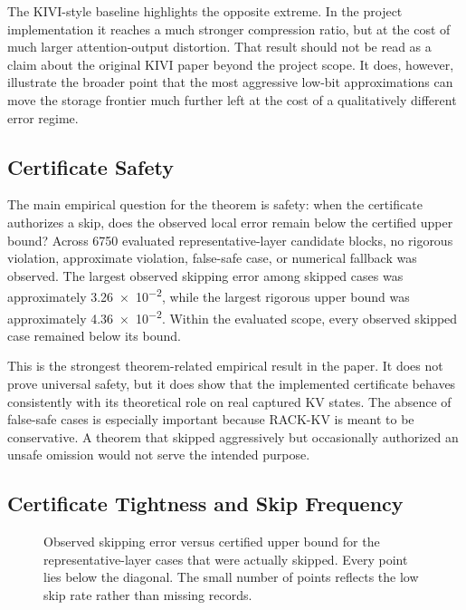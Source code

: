 The KIVI-style baseline highlights the opposite extreme. In the project implementation it reaches a much stronger compression ratio, but at the cost of much larger attention-output distortion. That result should not be read as a claim about the original KIVI paper beyond the project scope. It does, however, illustrate the broader point that the most aggressive low-bit approximations can move the storage frontier much further left at the cost of a qualitatively different error regime.

\subsection{Certificate Safety}

The main empirical question for the theorem is safety: when the certificate authorizes a skip, does the observed local error remain below the certified upper bound? Across \num{6750} evaluated representative-layer candidate blocks, no rigorous violation, approximate violation, false-safe case, or numerical fallback was observed. The largest observed skipping error among skipped cases was approximately \num{3.26e-2}, while the largest rigorous upper bound was approximately \num{4.36e-2}. Within the evaluated scope, every observed skipped case remained below its bound.

\begin{table}[t]
  \centering
  \small
  
  \caption{Representative-layer certificate summary for RACK-KV. The key result is the absence of observed violations; the equally important limitation is the low certified skip rate.}
  \label{tab:cert}
\end{table}

This is the strongest theorem-related empirical result in the paper. It does not prove universal safety, but it does show that the implemented certificate behaves consistently with its theoretical role on real captured KV states. The absence of false-safe cases is especially important because RACK-KV is meant to be conservative. A theorem that skipped aggressively but occasionally authorized an unsafe omission would not serve the intended purpose.

\subsection{Certificate Tightness and Skip Frequency}

\begin{figure}[t]
  \centering
  
  \caption{Observed skipping error versus certified upper bound for the representative-layer cases that were actually skipped. Every point lies below the diagonal. The small number of points reflects the low skip rate rather than missing records.}
  \label{fig:boundobserved}
\end{figure}

